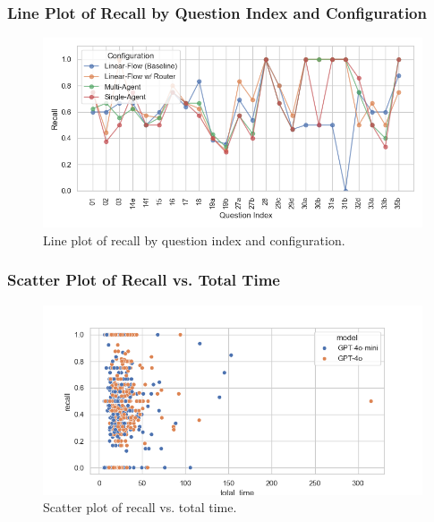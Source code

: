             \subsubsection{Line Plot of Recall by Question Index and Configuration}
            \begin{figure}[H]
                \centering
                \includegraphics[width=\textwidth]{images_exp2/recall/recall_lineplot_by_question_index_and_configuration.png}
                \caption{Line plot of recall by question index and configuration.}
                \label{fig:recall_lineplot_by_question_index_and_configuration}
            \end{figure}

            \subsubsection{Scatter Plot of Recall vs. Total Time}
            \begin{figure}[H]
                \centering
                \includegraphics[scale=0.75]{images_exp2/recall/scatter_recall_vs_total_time.png}
                \caption{Scatter plot of recall vs. total time.}
                \label{fig:scatter_recall_vs_total_time}
            \end{figure}

